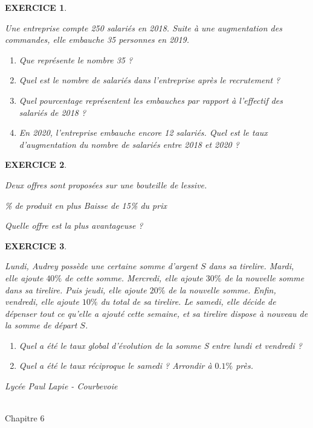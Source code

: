 \documentclass[a4paper]{article}   %
\renewcommand{\(}{\left(}
\renewcommand{\)}{\right)}
\newtheorem{EXO}{\large EXERCICE }
\newenvironment{EX}   { \setcounter{ques}{0} \begin{EXO} \hrulefill ~\vspace{0.3cm}

\normalfont}    {\end{EXO} \medskip}
\def\cl{{\Large \bf{2nde}}}
\begin{document}
\begin{EX} Une entreprise compte 250 salariés en 2018. Suite à une augmentation des commandes, elle embauche 35 personnes en 2019. 
\begin{enumerate}
\item Que représente le nombre 35 ?
\item Quel est le nombre de salariés dans l'entreprise après le recrutement ?
\item Quel pourcentage représentent les embauches par rapport à l'effectif des salariés de 2018 ?
\item En 2020, l'entreprise embauche encore 12 salariés. Quel est le taux d'augmentation du nombre de salariés entre 2018 et 2020 ?
\end{enumerate}
\end{EX}

\begin{EX} 
Deux offres sont proposées sur une bouteille de lessive. 
\begin{center}
\% de produit en plus \fg{} \hspace{2cm} \og Baisse de 15\% du prix \fg{} 
\end{center}
Quelle offre est la plus avantageuse ?
\end{EX}

\begin{EX} Lundi, Audrey possède une certaine somme d'argent $S$ dans sa tirelire. Mardi, elle ajoute $40\%$ de cette somme. Mercredi, elle ajoute $30 \%$ de la nouvelle somme dans sa tirelire. Puis jeudi, elle ajoute $20\%$ de la nouvelle somme. Enfin, vendredi, elle ajoute $10\%$ du total de sa tirelire. Le samedi, elle décide de dépenser tout ce qu'elle a ajouté cette semaine, et sa tirelire dispose à nouveau de la somme de départ $S$. 
\begin{enumerate}
\item Quel a été le taux global d'évolution de la somme S entre lundi et vendredi ?
\item Quel a été le taux réciproque le samedi ? Arrondir à $0.1\%$ près.
\end{enumerate}
\end{EX}





\newpage \setcounter{EXO}{0}

\noindent\begin{minipage}{.20\linewidth}\begin{center}                  
\noindent \emph{Lycée Paul Lapie - Courbevoie}
\end{center}\end{minipage}
\begin{minipage}{1.5\linewidth}\begin{center}	
\noindent \cl \\ Chapitre 6
\end{center}\end{minipage}
\end{document}
